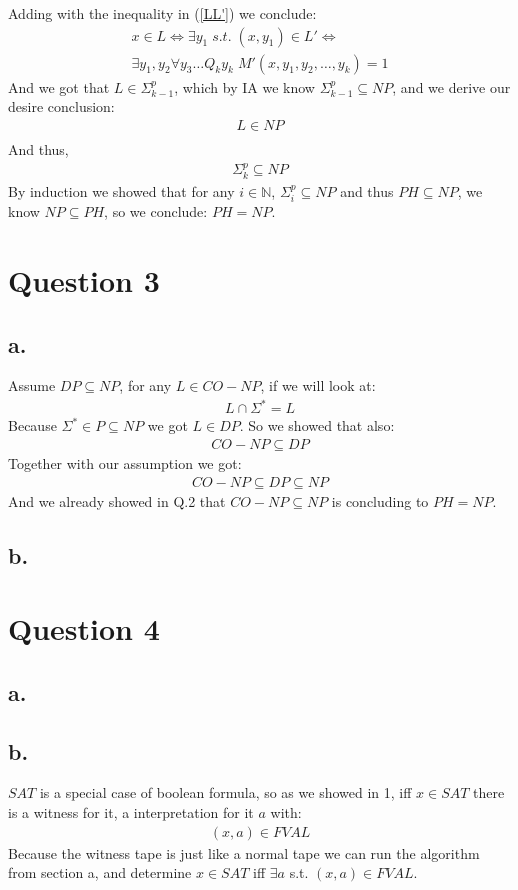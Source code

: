 \documentclass[11pt]{article}
\theoremstyle{plain}
\theoremstyle{nonumberplainnobrackets}
\begin{document}
Adding with the inequality in (\ref{LL'})  we conclude:
\begin{align*}
x\in L \iff \exists y_1 \; s.t.\; (x,y_1) \in L' \iff \\
\exists y_1,y_2  \forall y_3\ldots Q_ky_k \;M'(x,y_1,y_2,\ldots,y_k) =1 
\end{align*}
And we got that $L\in \Sigma_{k-1}^p$, which by IA we know $\Sigma_{k-1}^p\subseteq NP$, and we derive our desire conclusion:
\begin{align*}
L\in NP \\
\end{align*}
And thus,
\begin{align*}
\Sigma_k^p \subseteq NP
\end{align*}
By induction we showed that for any $i\in \mathbb{N}$, $\Sigma_i^p\subseteq NP$ and thus $PH\subseteq NP$, we know $NP\subseteq PH$, so we conclude: $PH= NP$.
\section*{Question 3}
\subsection*{a. }
Assume $DP\subseteq NP$, for any $L\in CO-NP$, if we will look at: \begin{align*}
	L\cap \Sigma^* = L
\end{align*}
Because $\Sigma^*\in P \subseteq NP$ we got $L\in DP$. So we showed that also:\
\begin{align*}
CO-NP \subseteq DP
\end{align*}
Together with our assumption we got:
\begin{align*}
CO-NP \subseteq DP \subseteq NP
\end{align*}
And we already showed in Q.2 that $CO-NP \subseteq NP$ is concluding to $PH=NP$.
\subsection*{b. }
\section*{Question 4}
\subsection*{a. }
\subsection*{b. } $SAT$ is a special case of boolean formula, so as we showed in 1, iff $x\in SAT$ there is a witness for it, a interpretation for it $a$ with:  
\begin{align*}
(x,a)\in FVAL
\end{align*}
Because the witness tape is just like a normal tape we can run the algorithm from section a, and determine $x\in SAT$ iff $\exists a$ s.t. $ (x,a)\in FVAL$. 
\end{document}
